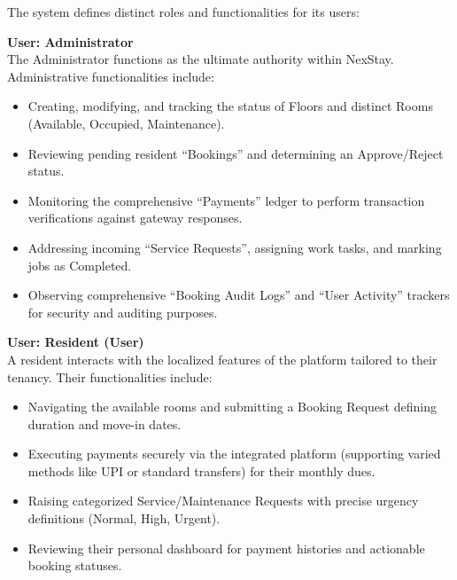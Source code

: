 \documentclass[12pt,a4paper]{report}
\begin{document}
The system defines distinct roles and functionalities for its users:

\textbf{User: Administrator}\\
The Administrator functions as the ultimate authority within NexStay. Administrative functionalities include:
\begin{itemize}
    \item Creating, modifying, and tracking the status of Floors and distinct Rooms (Available, Occupied, Maintenance).
    \item Reviewing pending resident ``Bookings'' and determining an Approve/Reject status.
    \item Monitoring the comprehensive ``Payments'' ledger to perform transaction verifications against gateway responses.
    \item Addressing incoming ``Service Requests'', assigning work tasks, and marking jobs as Completed. 
    \item Observing comprehensive ``Booking Audit Logs'' and ``User Activity'' trackers for security and auditing purposes.
\end{itemize}

\textbf{User: Resident (User)}\\
A resident interacts with the localized features of the platform tailored to their tenancy. Their functionalities include:
\begin{itemize}
    \item Navigating the available rooms and submitting a Booking Request defining duration and move-in dates.
    \item Executing payments securely via the integrated platform (supporting varied methods like UPI or standard transfers) for their monthly dues.
    \item Raising categorized Service/Maintenance Requests with precise urgency definitions (Normal, High, Urgent).
    \item Reviewing their personal dashboard for payment histories and actionable booking statuses.
\end{itemize}
\end{document}
